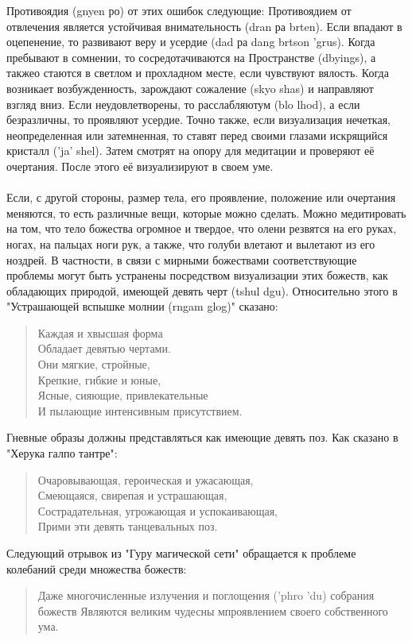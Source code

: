 Противоядия (gnyen ро) от этих ошибок следующие: Противо\-ядием от отвлечения
является устойчивая внимательность (dran ра brten). Если впадают в оцепенение, то
развивают веру и усердие (dad ра dang brtson 'grus). Когда пребывают в сомнении, то
сосредотачиваются на Пространстве (dbyings), а такжео стаются в светлом и прохладном
месте, если чувствуют вялость. Когда возникает возбужденность, зарождают сожаление (skyo
shas) и направляют взгляд вниз. Если неудовлетворены, то расслабляютум (blo lhod), а если
безразличны, то проявляют усердие. Точно также, если визуализация нечеткая,
неопределенная или затемненная, то ставят перед своими глазами искрящийся кристалл ('ja'
shel). Затем смотрят на опору для медитации и проверяют её очертания. После этого её
визуализируют в своем уме.\\
\\
Если, с другой стороны, размер тела, его проявление, положе\-ние или очертания
меняются, то есть различные вещи, которые можно сделать. Можно медитировать на том,
что тело божества огромное и твердое, что олени резвятся на его руках, ногах, на пальцах
ноги рук, а также, что голуби влетают и вылетают из его ноздрей. В частности, в связи с
мирными божествами соответствующие проблемы могут быть устранены посредством
визуализации этих божеств, как обладающих природой, имеющей девять черт (tshul dgu).
Относительно этого в "Устрашающей вспышке молнии (rngam glog)" сказано:
\begin{verse}
Каждая и хвысшая форма\\
Обладает девятью чертами.\\
Они мягкие, стройные,\\
Крепкие, гибкие и юные,\\
Ясные, сияющие, привлекательные\\
И пылающие интенсивным присутствием.
\end{verse}
Гневные образы должны представляться как имеющие девять поз. Как сказано в "Херука галпо тантре":
\begin{verse}
Очаровывающая, героическая и ужасающая,\\
Смеющаяся, свирепая и устрашающая,\\
Сострадательная, угрожающая и успокаивающая,\\
Прими эти девять танцевальных поз.
\end{verse}
Следующий отрывок из "Гуру магической сети" обращается к проблеме колебаний среди множества божеств:
\begin{verse}
Даже многочисленные излучения и поглощения ('phro 'du) собрания божеств
Являются великим чудесны мпроявлением своего собственного ума.
\end{verse}
